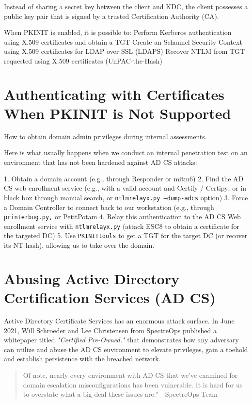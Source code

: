 Instead of sharing a secret key between the client and KDC, the client possesses a public key pair that is signed by a trusted Certification Authority (CA).

When PKINIT is enabled, it is possible to:
Perform Kerberos authentication using X.509 certificates and obtain a TGT
Create an Schannel Security Context using X.509 certificates for LDAP over SSL (LDAPS)
Recover NTLM from TGT requested using X.509 certificates (UnPAC-the-Hash)

\section{Authenticating with Certificates When PKINIT is Not Supported}
How to obtain domain admin privileges during internal assessments. 

Here is what usually happens when we conduct an internal penetration test on an environment that has not been hardened against AD CS attacks:

1. Obtain a domain account (e.g., through Responder or mitm6)
2. Find the AD CS web enrollment service (e.g., with a valid account and Certify / Certipy; or in black box through manual search, or \texttt{ntlmrelayx.py --dump-adcs} option)
3. Force a Domain Controller to connect back to our workstation (e.g., through \texttt{printerbug.py,} or PetitPotam
4. Relay this authentication to the AD CS Web enrollment service with \texttt{ntlmrelayx.py} (attack ESC8 to obtain a certificate for the targeted DC)
5. Use \texttt{PKINITtools} to get a TGT for the target DC (or recover its NT hash), allowing us to take over the domain.

\section{Abusing Active Directory Certification Services (AD CS)}
Active Directory Certificate Services has an enormous attack surface.
In June 2021, Will Schroeder and Lee Christensen from SpectreOps published a whitepaper titled \textit{"Certified Pre-Owned."} that demonstrates how any adversary can utilize and abuse the AD CS environment to elevate privileges, gain a toehold and establish persistence with the breached network.
\begin{quote}
    Of note, nearly every environment with AD CS that we've examined for domain escalation misconfigurations has been vulnerable. It is hard for us to overstate what a big deal these issues are." - SpectreOps Team
    \end{quote}
    
